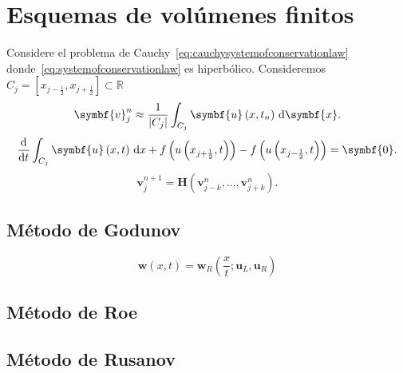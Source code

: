 \chapter{Esquemas de volúmenes finitos}

Considere el problema de Cauchy~\eqref{eq:cauchysystemofconservationlaw}
donde~\eqref{eq:systemofconservationlaw} es hiperbólico.
Consideremos $C_{j}=\left[x_{j-\frac{1}{2}},x_{j+\frac{1}{2}}\right]\subset\mathbb{R}$
\begin{equation*}
	\symbf{v}^{n}_{j}\approx
	\frac{1}{\left|C_{j}\right|}
	\int_{C_{j}}
	\symbf{u}\left(x,t_{n}\right)\dl{\symbf{x}}.
\end{equation*}
\begin{equation*}
	\diff{}{t}
	\int_{C_{j}}
	\symbf{u}\left(x,t\right)\dl x+
	f\left(u\left(x_{j+\frac{1}{2}},t\right)\right)-
	f\left(u\left(x_{j-\frac{1}{2}},t\right)\right)=
	\symbf{0}.
\end{equation*}
\begin{equation*}
	\symbf{v}^{n+1}_{j}=
	\symbf{H}\left(\symbf{v}^{n}_{j-k},\dotsc,\symbf{v}^{n}_{j+k}\right).
\end{equation*}

\section{Método de Godunov}

\begin{equation*}
	\symbf{w}\left(x,t\right)=
	\symbf{w}_{R}
	\left(\frac{x}{t};\symbf{u}_{L},\symbf{u}_{R}\right)
\end{equation*}

\section{Método de Roe}

\section{Método de Rusanov}
